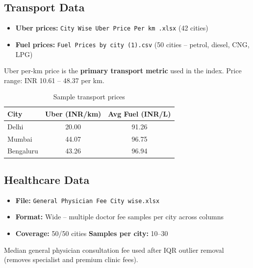 \documentclass[12pt,a4paper]{article}
\begin{document}
\subsection{Transport Data}

\begin{itemize}[leftmargin=*]
  \item \textbf{Uber prices:} \texttt{City Wise Uber Price Per km .xlsx} (42 cities)
  \item \textbf{Fuel prices:} \texttt{Fuel Prices by city (1).csv} (50 cities -- petrol, diesel, CNG, LPG)
\end{itemize}

Uber per-km price is the \textbf{primary transport metric} used in the index. Price range:
INR 10.61 -- 48.37 per km.

\begin{table}[H]
  \centering
  \begin{tabular}{lcc}
    \toprule
    \textbf{City} & \textbf{Uber (INR/km)} & \textbf{Avg Fuel (INR/L)} \\
    \midrule
    Delhi     & 20.00 & 91.26 \\
    Mumbai    & 44.07 & 96.75 \\
    Bengaluru & 43.26 & 96.94 \\
    \bottomrule
  \end{tabular}
  \caption{Sample transport prices}
\end{table}

\subsection{Healthcare Data}

\begin{itemize}[leftmargin=*]
  \item \textbf{File:} \texttt{General Physician Fee City wise.xlsx}
  \item \textbf{Format:} Wide -- multiple doctor fee samples per city across columns
  \item \textbf{Coverage:} 50/50 cities \quad \textbf{Samples per city:} 10--30
\end{itemize}

Median general physician consultation fee used after IQR outlier removal (removes specialist
and premium clinic fees).

\end{document}
